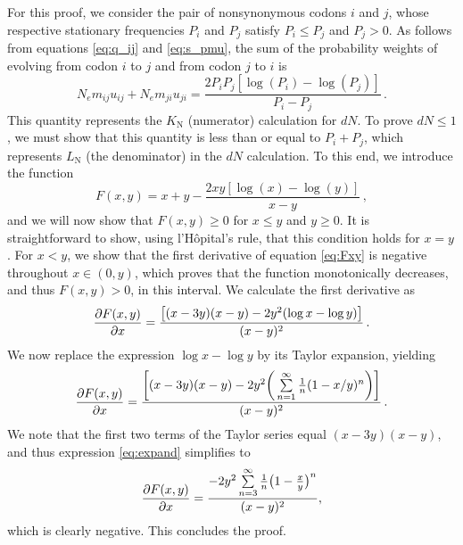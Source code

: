 \documentclass[11pt]{article}
\begin{document}
For this proof, we consider the pair of nonsynonymous codons $i$ and $j$, whose respective stationary frequencies $P_i$ and $P_j$ satisfy $P_i \leq P_j$ and $P_j > 0$. As follows from equations \eqref{eq:q_ij} and \eqref{eq:s_pmu}, the sum of the probability weights of evolving from codon $i$ to $j$ and from codon $j$ to $i$ is
\begin{equation}
N_em_{ij} u_{ij} + N_em_{ji} u_{ji}  = \frac{2P_iP_j[\log(P_i) - \log(P_j)]}{P_i - P_j} \,.
\end{equation}
This quantity represents the $K_\text{N}$ (numerator) calculation for $dN$. To prove $dN \leq 1$, we must show that this quantity is less than or equal to $P_i + P_j$, which represents $L_\text{N}$ (the denominator) in the $dN$ calculation. To this end, we introduce the function 
\begin{equation}\label{eq:Fxy}
F(x,y) = x + y - \frac{2xy[\log(x) - \log(y)]}{x - y} \,,
\end{equation}
and we will now show that $F(x,y) \geq 0$ for $x \leq y$ and $y \geq 0 $. It is straightforward to show, using l'H\^{o}pital's rule, that this condition holds for $x=y$. For $x < y$, we show that the first derivative of equation \eqref{eq:Fxy} is negative throughout $x \in (0,y)$, which proves that the function monotonically decreases, and thus $F(x,y) > 0$, in this interval. We calculate the first derivative as 
\begin{equation}
\frac{\partial{F(x,y)}}{\partial{x}} = \frac{\big{[} (x-3y)(x-y) - 2y^2(\log{x} - \log{y}) \big{]}}{(x-y)^2} \,.
\end{equation}
We now replace the expression $\log{x} - \log{y}$ by its Taylor expansion, yielding
\begin{equation}\label{eq:expand}
	\frac{\partial{F(x,y)}}{\partial{x}} = 
	\frac{ \bigg{[} (x-3y)(x-y) - 2y^2\bigg{(}\sum\limits_{n=1}^\infty \frac{1}{n} (1-x/y)^n\bigg{)} \bigg{]}}{(x-y)^2} \,.
\end{equation} We note that the first two terms of the Taylor series equal $(x-3y)(x-y)$, and thus expression \eqref{eq:expand} simplifies to 
\begin{equation}
\frac{\partial{F(x,y)}}{\partial{x}} = \frac{-2y^2\sum\limits_{n=3}^\infty \frac{1}{n} \big{(}1-\frac{x}{y}\big{)}^n}{(x-y)^2} ,
\end{equation}
which is clearly negative. This concludes the proof.


\bigskip
\end{document}
